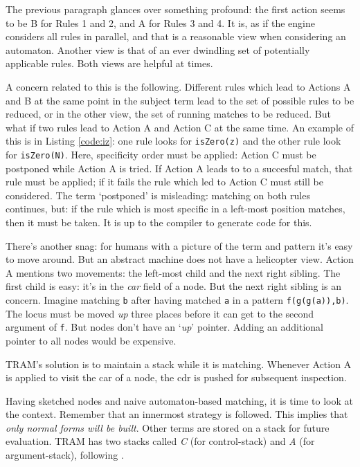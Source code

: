 \documentclass[11pt,twoside]{memoir}
\def\E{\emph} %
\def\T{\texttt}
\begin{document}
The previous paragraph glances over something profound: the first action seems to be B for Rules 1 and 2, and A for Rules 3 and 4. It is, as if the engine considers all rules in parallel, and that is a reasonable view when considering an automaton. Another view is that of an ever dwindling set of potentially applicable rules. Both views are helpful at times.

A concern related to this is the following. Different rules which lead to Actions A and B at the same point in the subject term lead to the set of possible rules to be reduced, or in the other view, the set of running matches to be reduced. But what if two rules lead to Action A and Action C at the same time. An example of this is in Listing \ref{code:iz}: one rule looks for \T{isZero(z)} and the other rule look for \T{isZero(N)}. Here, specificity order must be applied: Action C must be postponed while Action A is tried. If Action A leads to to a succesful match, that rule must be applied; if it fails the rule which led to Action C must still be considered. The term `postponed' is misleading: matching on both rules continues, but: if the rule which is most specific in a left-most position matches, then it must be taken. It is up to the compiler to generate code for this.

There's another snag: for humans with a picture of the term and pattern it's easy to move around. But an abstract machine does not have a helicopter view. Action A mentions two movements: the left-most child and the next right sibling. The first child is easy: it's in the \E{car} field of a node. But the next right sibling is an concern. Imagine matching \T{b} after having matched \T{a} in a pattern \T{f(g(g(a)),b)}. The locus must be moved \E{up} three places before it can get to the second argument of \T{f}. But nodes don't have an `\E{up}' pointer. Adding an additional pointer to all nodes would be expensive.

TRAM's solution is to maintain a stack while it is matching. Whenever Action A is applied to visit the car of a node, the cdr is pushed for subsequent inspection.

Having sketched nodes and naive automaton-based matching, it is time to look at the context. Remember that an innermost strategy is followed. This implies that \E{only normal forms will be built}. Other terms are stored on a stack for future evaluation. TRAM has two stacks called \E{C} (for control-stack) and \E{A} (for argument-stack), following \cite{(Fokkink et al., 1998)}. 
\end{document}
